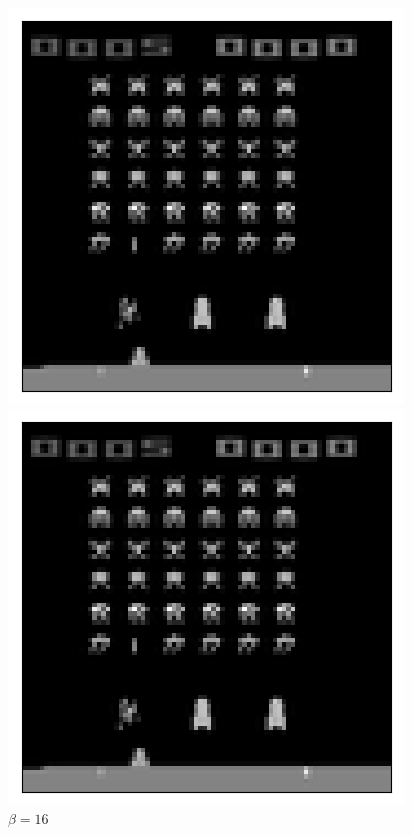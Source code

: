 \begin{figure}[h!]
\begin{multicols}{4}
    \includegraphics[scale=0.4]{figures/results/latent_image/beta_4_sample_0_reconstructed.png}
    \caption{$\beta = 4$}
    \includegraphics[scale=0.4]{figures/results/latent_image/beta_16_sample_0_reconstructed.png}
    \caption{$\beta = 16$}
\end{multicols}
\begin{multicols}{4}

\end{multicols}
\end{figure}
